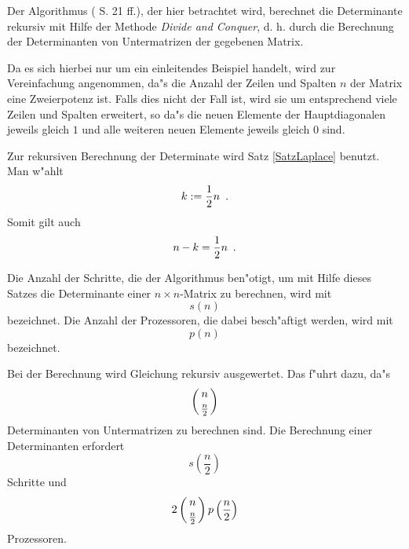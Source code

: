 
\label{SecDivCon}

Der Algorithmus (\cite{Csan74} S. 21 ff.), der hier betrachtet wird,
berechnet die Determinante
rekursiv mit Hilfe der Methode {\em Divide and Conquer}, d. h. durch
die Berechnung der Determinanten von Untermatrizen der gegebenen Matrix.

Da es sich hierbei nur um ein einleitendes Beispiel handelt, wird zur
Vereinfachung angenommen,
da"s die Anzahl der Zeilen und Spalten $n$ der
Matrix eine Zweierpotenz ist. Falls dies nicht der Fall ist, wird sie um
entsprechend viele Zeilen und Spalten erweitert, so da"s die neuen
Elemente der Hauptdiagonalen jeweils gleich $1$ und alle weiteren
neuen Elemente jeweils gleich $0$ sind.

Zur rekursiven Berechnung der Determinate wird Satz \ref{SatzLaplace}
benutzt. Man w"ahlt
\[ k := \frac{1}{2}n \mbox{\hspace{0.5em}.} \]
Somit gilt auch \[ n-k = \frac{1}{2}n \mbox{\hspace{0.5em}.} \]

Die Anzahl der Schritte, die der Algorithmus ben"otigt, um mit Hilfe 
dieses Satzes die Determinante einer $n \times n$-Matrix zu berechnen, 
wird mit \[ s(n) \] bezeichnet. Die Anzahl der Prozessoren, die dabei
besch"aftigt werden, wird mit \[ p(n) \] bezeichnet.

Bei der Berechnung wird Gleichung
 rekursiv ausgewertet. Das f"uhrt dazu, da"s
\[ \left( { n \atop  \frac{n}{2}  } \right) \] Determinanten von Untermatrizen zu
berechnen sind. Die Berechnung einer Determinanten erfordert
\[ s\left( \frac{n}{2} \right) \] Schritte und
\[ 2 \left( { n \atop  \frac{n}{2}  } \right) p\left( \frac{n}{2} \right) \] Prozessoren.

